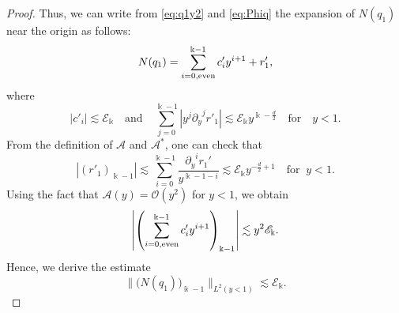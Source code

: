 \documentclass[11pt]{aims}
\theoremstyle{definition}
\numberwithin{equation}{section}
\begin{document}
\begin{proof}
Thus, we can write from \eqref{eq:q1y2} and \eqref{eq:Phiq} the expansion of $N(q_1)$ near the origin as follows:
\begin{equation}\label{eq:expanNq1at0}
N(q_1) = \sum_{i = 0, \textup{even}}^{\Bbbk -1}c_i'y^{i + 1} + r'_1,
\end{equation}
where
$$|c'_i| \lesssim {\mathscr{E}}_\Bbbk \quad \text{and} \quad \sum_{j = 0}^{\Bbbk - 1}|y^j {\partial_y}^j r'_1| \lesssim {\mathscr{E}}_\Bbbk y^{\Bbbk - \frac{d}{2}} \quad \text{for} \quad y < 1.$$
From the definition of ${\mathscr{A}}$ and ${\mathscr{A}}^*$, one can check that 
$$|(r'_1)_{\Bbbk - 1}| \lesssim \sum_{i = 0}^{\Bbbk - 1}\frac{{\partial_y}^i r_1'}{y^{\Bbbk - 1 - i}} \lesssim {\mathscr{E}}_\Bbbk y^{-\frac{d}{2}  +1} \quad \text{for}\;\; y < 1.$$
Using the fact that ${\mathscr{A}}(y) = {\mathcal{O}}(y^2)$ for $y < 1$, we obtain 
$$\left|\left(\sum_{i = 0, \textup{even}}^{\Bbbk -1}c_i'y^{i + 1} \right)_{\Bbbk - 1}\right| \lesssim y^2 {\mathscr{E}}_\Bbbk.$$
Hence, we derive the estimate
\begin{equation}\label{eq:controlNqi0}
\|\big(N(q_1)\big)_{\Bbbk - 1}\|_{L^2(y < 1)} \lesssim {\mathscr{E}}_\Bbbk.
\end{equation}


\end{proof}
\end{document}
